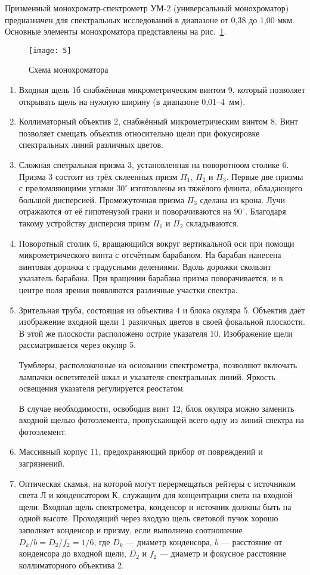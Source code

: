 \documentclass[a4paper]{article}
\begin{document}
Призменный монохроматр-спектрометр УМ-2 (универсальный монохроматор)
предназначен для спектральных исследований в диапазоне от 0,38 до
1,00 мкм. Основные элементы монохроматора представлены на рис.~\ref{fig:5}.
\begin{figure}[h]
	\centering
	\texttt{[image: 5]}
	\caption{Схема монохроматора}
	\label{fig:5}
\end{figure}
\begin{enumerate}
	\item Входная щель 1б снабжённая микрометрическим винтом
		9, который позволяет открывать щель на нужную
		ширину (в диапазоне 0,01--4~мм).
	\item Коллиматорный объектив 2, снабжённый микрометрическим
		винтом 8. Винт позволяет смещать объектив
		относительно щели при фокусировке спектральных
		линий различных цветов.
	\item Сложная спетральная призма 3, установленная на
		поворотноом столике 6. Призма 3 состоит из трёх
		склеенных призм $\Pi_1,\, \Pi_2$ и $\Pi_3$.
		Первые две призмы с преломляющими углами $30^\circ$
		изготовлены из тяжёлого флинта, обладающего большой
		дисперсией. Промежуточная призма  $\Pi_3$ сделана
		из крона. Лучи отражаются от её гипотенузой
		грани и поворачиваются на $90^\circ$. Благодаря
		такому устройству дисперсия призм $\Pi_1$ и $\Pi_2$
		складываются.
	 \item Поворотный столик 6, вращающийся вокруг вертикальной
		 оси при помощи микрометрического винта с
		 отсчётным барабаном. На барабан нанесена винтовая
		 дорожка с градусными делениями. Вдоль дорожки
		 скользит указатель барабана. При вращении
		 барабана призма поворачивается, и в центре поля
		 зрения появляются различные участки спектра.
	\item Зрительная труба, состоящая из объектива 4
		 и блока окуляра 5. Объектив даёт изображение
		 входной щели 1 различных цветов в своей фокальной
		 плоскости. В этой же плоскости расположено
		 острие указателя 10. Изображение щели
		 рассматривается через окуляр 5.

		 Тумблеры, расположенные на основании спектрометра,
		 позволяют включать лампачки осветителей шкал и
		 указателя спектральных линий. Яркость освещения
		 указателя регулируется реостатом.

		 В случае необходимости, освободив винт 12, блок
		 окуляра можно заменить входной щелью фотоэлемента,
		 пропускающей всего одну из линий спектра на
		 фотоэлемент.
	\item Массивный корпус 11, предохраняющий прибор от
		повреждений и загрязнений.
	\item Оптическая скамья, на которой могут перермещаться
		рейтеры с источником света Л и конденсатором К,
		служащим для концентрации света на входной щели.
		Входная щель спектрометра, конденсор и источник
		должны быть на одной высоте.
		Проходящий через входую щель световой пучок хорошо
		заполняет конденсор и призму, если выполнено
		соотношение $D_k /b= D_2 /f_2= 1 /6$, где $D_k$ ---
		диаметр конденсора, $b$ --- расстояние от
		конденсора до входной щели, $D_2$ и $f_2$ ---
		диаметр и фокусное расстояние коллиматорного
		объектива 2.


\end{enumerate}
\end{document}
